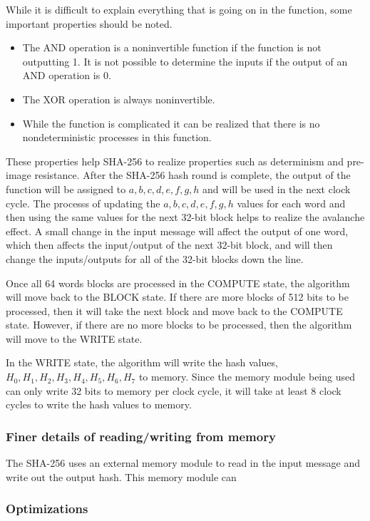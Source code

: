 \documentclass{article}
\begin{document}
While it is difficult to explain everything that is going on in the function, some important properties should be noted.
\begin{itemize}
  \item The AND operation is a noninvertible function if the function is not outputting 1. It is not possible to determine the inputs if the output of an AND operation is 0.
  \item The XOR operation is always noninvertible.
  \item While the function is complicated it can be realized that there is no nondeterministic processes in this function.
\end{itemize}
These properties help SHA-256 to realize properties such as determinism and pre-image resistance. After the SHA-256 hash round is complete, the output of the function will be assigned to $a,b,c,d,e,f,g,h$ and will be used in the next clock cycle. The processs of updating the $a,b,c,d,e,f,g,h$ values for each word and then using the same values for the next 32-bit block helps to realize the avalanche effect. A small change in the input message will affect the output of one word, which then affects the input/output of the next 32-bit block, and will then change the inputs/outputs for all of the 32-bit blocks down the line.

Once all 64 words blocks are processed in the COMPUTE state, the algorithm will move back to the BLOCK state. If there are more blocks of 512 bits to be processed, then it will take the next block and move back to the COMPUTE state. However, if there are no more blocks to be processed, then the algorithm will move to the WRITE state.

In the WRITE state, the algorithm will write the hash values, $H_0, H_1, H_2, H_3, H_4, H_5, H_6, H_7$ to memory. Since the memory module being used can only write 32 bits to memory per clock cycle, it will take at least 8 clock cycles to write the hash values to memory.

\subsubsection{Finer details of reading/writing from memory}

The SHA-256 uses an external memory module to read in the input message and write out the output hash. This memory module can

\subsubsection{Optimizations}
\end{document}
